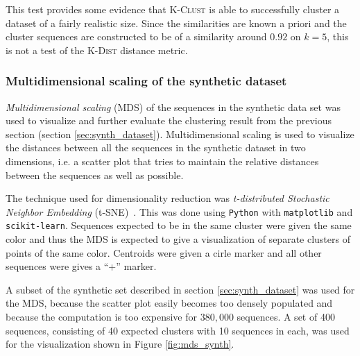 This test provides some evidence that \textsc{K-Clust} is able to successfully
cluster a dataset of a fairly realistic size. Since the similarities are known
a priori and the cluster sequences are constructed to be of a similarity around
$0.92$ on $k=5$, this is not a test of the \textsc{K-Dist} distance metric.


\subsubsection{Multidimensional scaling of the synthetic dataset}
\label{sec:mds_synth}

\emph{Multidimensional scaling} (MDS) of the sequences in the synthetic data
set was used to visualize and further evaluate the clustering result from the
previous section (section \ref{sec:synth_dataset}). Multidimensional scaling
is used to visualize the distances between all the sequences in the synthetic
dataset in two dimensions, i.e. a scatter plot that tries to maintain the
relative distances between the sequences as well as possible.

The technique used for dimensionality reduction was \emph{t-distributed
Stochastic Neighbor Embedding} (t-SNE)~\cite{maaten}. This was done using
\texttt{Python} with \texttt{matplotlib} and \texttt{scikit-learn}. Sequences
expected to be in the same cluster were given the same color and thus the MDS
is expected to give a visualization of separate clusters of points of the same
color. Centroids were given a cirle marker and all other sequences were gives a
``+'' marker.

A subset of the synthetic set described in section \ref{sec:synth_dataset} was
used for the MDS, because the scatter plot easily becomes too densely populated
and because the computation is too expensive for $380,000$ sequences. A set of
400 sequences, consisting of 40 expected clusters with 10 sequences in each,
was used for the visualization shown in Figure \ref{fig:mds_synth}.

